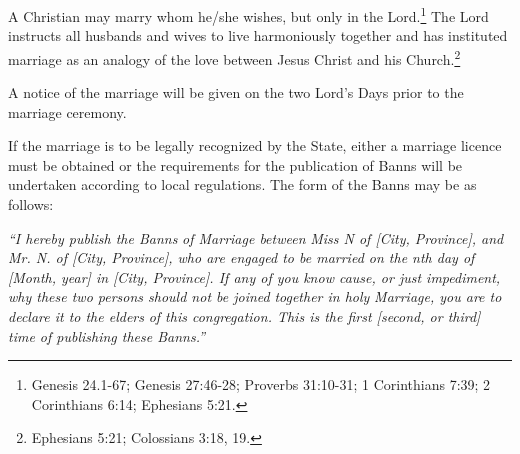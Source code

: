 \begin{outerlst}[left=0pt,labelsep=0pt]
\begin{innerlst}[resume*]
      \item A Christian may marry whom he/she wishes, but only in the Lord.\footnote{Genesis 24.1-67; Genesis 27:46-28; Proverbs 31:10-31; 1 Corinthians 7:39; 2 Corinthians 6:14; Ephesians 5:21.} The Lord instructs all husbands and wives to live harmoniously together and has instituted marriage as an analogy of the love between Jesus Christ and his Church.\footnote{Ephesians 5:21; Colossians 3:18, 19.} 
      \item A notice of the marriage will be given on the two Lord's Days prior to the marriage ceremony. 
      \item If the marriage is to be legally recognized by the State, either a marriage licence must be obtained or the requirements for the publication of Banns will be undertaken according to local regulations. The form of the Banns may be as follows: 
\end{innerlst}
\textit{{``I hereby publish the Banns}}\textit{ of Marriage between}\textit{ Miss N of [City, Province], and Mr. N. of [City, Province], who are engaged to be married on the nth day of [Month, year] in [City, Province]. If any of you know cause, or just impediment}\textit{, why these two persons should not be joined}\textit{ together in holy}\textit{ Marriage, you are to declare it to the elders}\textit{ of this congregation. This is the first [second, or third] time of publishing these Banns.''}   


\end{outerlst}
